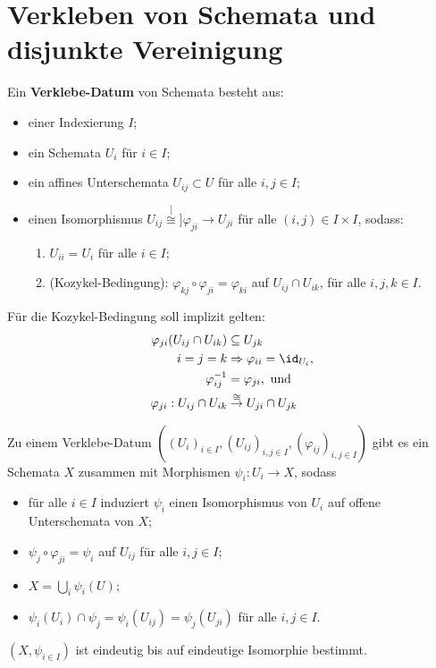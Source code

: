 \section{Verkleben von Schemata und disjunkte Vereinigung}
\begin{defn}
  Ein \textbf{Verklebe-Datum} von Schemata besteht aus:
  \begin{itemize}
  \item einer Indexierung $I$;
  \item ein Schemata $U_{i}$ für $i\in I$;
  \item ein affines Unterschemata $U_{ij}\subset U$ für alle $i,j\in I$;
  \item einen Isomorphismus $U_{ij}\stackrel[\cong]{\varphi_{ji}}{\longrightarrow}U_{ji}$
    für alle $(i,j)\in I\times I$, sodass:
    \begin{enumerate}
    \item $U_{ii}=U_{i}$ für alle $i\in I$;
    \item (Kozykel-Bedingung): $\varphi_{kj}\circ\varphi_{ji}=\varphi_{ki}$
      auf $U_{ij}\cap U_{ik}$, für alle $i,j,k\in I$.
    \end{enumerate}
  \end{itemize}
\end{defn}

Für die Kozykel-Bedingung soll implizit gelten:
\begin{align*}
  \varphi_{ji}(U_{ij}\cap U_{ik}) & \subseteq U_{jk}\\
  i=j=k & \Rightarrow\varphi_{ii}=\id_{U_{i}},\\
  \varphi_{ij}^{-1} & =\varphi_{ji},\text{ und}\\
  \varphi_{ji}:U_{ij}\cap U_{ik} & \overset{\cong}{\rightarrow}U_{ji}\cap U_{jk}
\end{align*}

\begin{prop}[9]
  Zu einem Verklebe-Datum $((U_{i})_{i\in I},(U_{ij})_{i,j\in I},(\varphi_{ij})_{i,j\in I})$
  gibt es ein Schemata $X$ zusammen mit Morphismen $\psi_{i}:U_{i}\rightarrow X$,
  sodass
  \begin{itemize}
  \item für alle $i\in I$ induziert $\psi_{i}$ einen Isomorphismus von $U_{i}$
    auf offene Unterschemata von $X$;
  \item $\psi_{j}\circ\varphi_{ji}=\psi_{i}$ auf $U_{ij}$ für alle $i,j\in I$;
  \item $X=\bigcup_{i}\psi_{i}(U)$;
  \item $\psi_{i}(U_{i})\cap\psi_{j}=\psi_{i}(U_{ij})=\psi_{j}(U_{ji})$ für
    alle $i,j\in I$.
  \end{itemize}
  $(X,\psi_{i\in I})$ ist eindeutig bis auf eindeutige Isomorphie bestimmt.
\end{prop}

